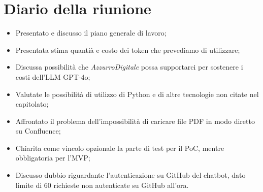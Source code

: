 

\section{Diario della riunione}

\begin{itemize}
    \item Presentato e discusso il piano generale di lavoro;
    \item Presentata stima quantià e costo dei token che prevediamo di utilizzare;
    \item Discussa possibilità che \emph{AzzurroDigitale} possa supportarci per sostenere i costi dell'LLM GPT-4o;
    \item Valutate le possibilità di utilizzo di Python e di altre tecnologie non citate nel capitolato;
    \item Affrontato il problema dell'impossibilità di caricare file PDF in modo diretto su Confluence;
    \item Chiarita come vincolo opzionale la parte di test per il PoC, mentre obbligatoria per l'MVP;
    \item Discusso dubbio riguardante l'autenticazione su GitHub del chatbot, dato limite di 60 richieste non autenticate su GitHub all'ora.
\end{itemize}
